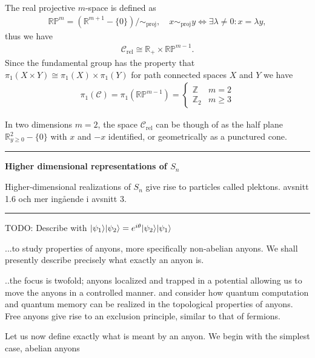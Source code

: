 \documentclass[a4paper,10pt,oneside]{book}
\theoremstyle{plain}
\theoremstyle{definition}
\theoremstyle{remark}
\newcommand{\Z}{\mathbb{Z}}
\newcommand{\R}{\mathbb{R}}
\DeclarePairedDelimiter\ket{\lvert}{\rangle}
\begin{document}
{The real projective $m$-space is defined as
\begin{align*}
  \R\mathbb{P}^m = (\R^{m+1}-\{0\})/\sim_\text{proj}, \quad x \sim_\text{proj} y \iff \exists \lambda \ne 0 : x = \lambda y,
\end{align*}
thus we have
\begin{align*}
  \mathcal{C}_\text{rel} \cong \R_+ \times \R\mathbb{P}^{m-1}.
\end{align*}
Since the fundamental group has the property that $\pi_1(X\times Y) \cong \pi_1(X) \times \pi_1(Y)$ for path connected spaces $X$ and $Y$ we have
\begin{align*}
  \pi_1(\mathcal{C}) = \pi_1(\R\mathbb{P}^{m-1}) =
  \begin{cases}
    \Z & m = 2 \\
    \Z_2 & m \ge 3
  \end{cases}
\end{align*}

In two dimensions $m=2$, the space $\mathcal{C}_\text{rel}$ can be though of as the half plane $\R^2_{y \ge 0} - \{ 0 \}$ with $x$ and $-x$ identified, or geometrically as a punctured cone.




\vspace{0.5cm}
\hrule
\vspace{0.5cm}

\textbf{Higher dimensional representations of $S_n$}

Higher-dimensional realizations of $S_n$ give rise to particles called plektons. \cite{fröhlich} avsnitt 1.6 och mer ingående i avsnitt 3.


\vspace{0.5cm}
\hrule
\vspace{0.5cm}



TODO: Describe with $\ket{\psi_1}\ket{\psi_2} = e^{i\theta} \ket{\psi_2}\ket{\psi_1}$


...to study properties of anyons, more specifically non-abelian anyons. We shall presently describe precisely what exactly an anyon is.

..the focus is twofold; anyons localized and trapped in a potential allowing us to move the anyons in a controlled manner. and consider how quantum computation and quantum memory can be realized in the topological properties of anyons. Free anyons give rise to an exclusion principle, similar to that of fermions.

Let us now define exactly what is meant by an anyon. We begin with the simplest case, abelian anyons

}
\end{document}
